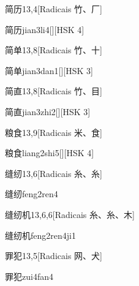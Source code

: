 \begin{entry}{简历}{13,4}[Radicais ⽵、⼚]
  \begin{phonetics}{简历}{jian3li4}[][HSK 4]
  \end{phonetics}
\end{entry}

\begin{entry}{简单}{13,8}[Radicais ⽵、⼗]
  \begin{phonetics}{简单}{jian3dan1}[][HSK 3]
  \end{phonetics}
\end{entry}

\begin{entry}{简直}{13,8}[Radicais ⽵、⽬]
  \begin{phonetics}{简直}{jian3zhi2}[][HSK 3]
  \end{phonetics}
\end{entry}

\begin{entry}{粮食}{13,9}[Radicais ⽶、⾷]
  \begin{phonetics}{粮食}{liang2shi5}[][HSK 4]
  \end{phonetics}
\end{entry}

\begin{entry}{缝纫}{13,6}[Radicais ⽷、⽷]
  \begin{phonetics}{缝纫}{feng2ren4}
  \end{phonetics}
\end{entry}

\begin{entry}{缝纫机}{13,6,6}[Radicais ⽷、⽷、⽊]
  \begin{phonetics}{缝纫机}{feng2ren4ji1}
  \end{phonetics}
\end{entry}

\begin{entry}{罪犯}{13,5}[Radicais ⽹、⽝]
  \begin{phonetics}{罪犯}{zui4fan4}
  \end{phonetics}
\end{entry}

